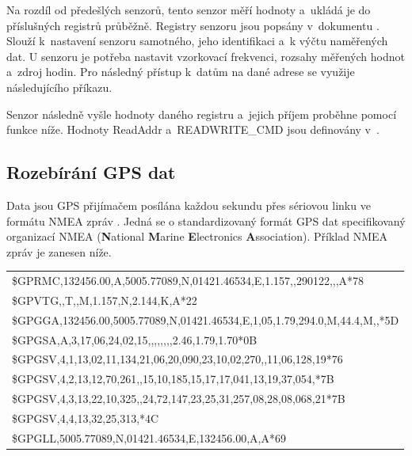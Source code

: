 \documentclass[twoside]{ctuthesis}
\theoremstyle{plain}
\theoremstyle{definition}
\theoremstyle{note}
\begin{document}
		Na rozdíl od předešlých senzorů, tento senzor měří hodnoty a~ukládá je do příslušných registrů průběžně. Registry senzoru jsou popsány v~dokumentu \cite{dsh_mpu_map}. Slouží k~nastavení senzoru samotného, jeho identifikaci a~k výčtu naměřených dat. U senzoru je potřeba nastavit vzorkovací frekvenci, rozsahy měřených hodnot a~zdroj hodin. Pro následný přístup k~datům na dané adrese se využije následujícího příkazu.
		
		Senzor následně vyšle hodnoty daného registru a~jejich příjem proběhne pomocí funkce níže. Hodnoty ReadAddr a~READWRITE\_CMD jsou definovány v~\cite{dsh_mpu_map}.
		
		


		\subsection{Rozebírání GPS dat}
		Data jsou GPS přijímačem posílána každou sekundu přes sériovou linku ve formátu NMEA zpráv \cite{nmea}. Jedná se o standardizovaný formát GPS dat specifikovaný organizací NMEA (\textbf{N}ational \textbf{M}arine \textbf{E}lectronics \textbf{A}ssociation). Příklad NMEA zpráv je zanesen níže.
		\begin{table}[h!]
			\centering
			\begin{tabular}{l}
				\$GPRMC,132456.00,A,5005.77089,N,01421.46534,E,1.157,,290122,,,A*78\\
				\$GPVTG,,T,,M,1.157,N,2.144,K,A*22\\
				\$GPGGA,132456.00,5005.77089,N,01421.46534,E,1,05,1.79,294.0,M,44.4,M,,*5D\\
				\$GPGSA,A,3,17,06,24,02,15,,,,,,,,2.46,1.79,1.70*0B\\
				\$GPGSV,4,1,13,02,11,134,21,06,20,090,23,10,02,270,,11,06,128,19*76\\
				\$GPGSV,4,2,13,12,70,261,,15,10,185,15,17,17,041,13,19,37,054,*7B\\
				\$GPGSV,4,3,13,22,10,325,,24,72,147,23,25,31,257,08,28,08,068,21*7B\\
				\$GPGSV,4,4,13,32,25,313,*4C\\
				\$GPGLL,5005.77089,N,01421.46534,E,132456.00,A,A*69\\
			\end{tabular}
		\end{table}
\end{document}
